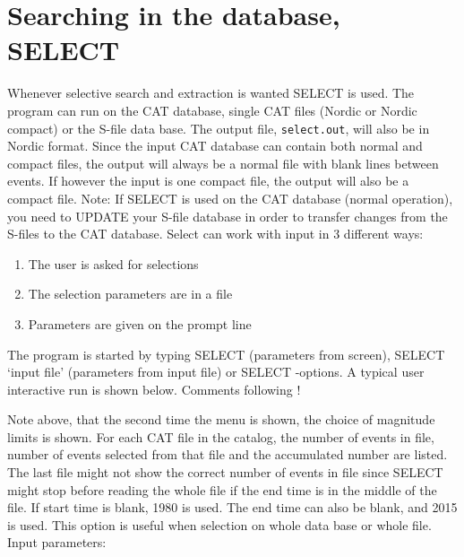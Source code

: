 
\section{Searching in the database, SELECT}
\label{sect:select}

Whenever selective search and extraction is wanted SELECT is used. The program can run on the CAT database, single CAT files (Nordic or Nordic compact) or the S-file data base. The output file, \texttt{select.out}, will also be in Nordic format. Since the input CAT database can contain both normal and compact files, the output will always be a normal file with blank lines between events. If however the input is one compact file, the output will also be a compact file. 
Note: If SELECT is used on the CAT database (normal operation), you need to UPDATE your S-file database in order to transfer changes from the S-files to the CAT database. 
Select can work with input in 3 different ways: 
\begin{enumerate}
\item 
The user is asked for selections 
\item 
The selection parameters are in a file 
\item 
Parameters are given on the prompt line 
\end{enumerate}
The program is started by typing SELECT (parameters from screen), 
SELECT `input file' (parameters from input file) or SELECT -options. 
A typical user interactive run is shown below. Comments following ! 



Note above, that the second time the menu is shown, the choice of magnitude limits is shown.  For each CAT file in the catalog, the number of events in file, number of events selected from that file and the accumulated number are listed. The last file might not show the correct number of events in file since SELECT might stop before reading the whole file if the end time is in the middle of the file. If start time is blank, 1980 is used. The end time can also be blank, and 2015 is used. This option is useful when selection on whole data base or whole file. 
Input parameters: 

